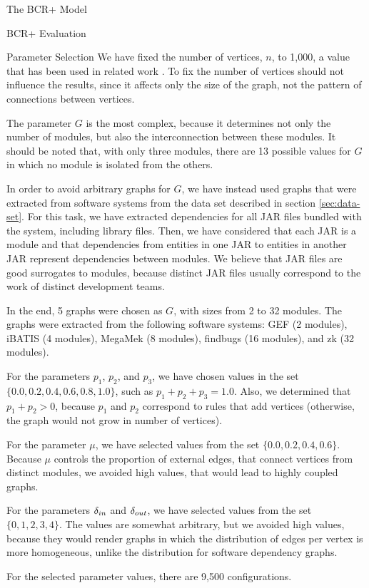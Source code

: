 \documentclass[11pt,twocolumn,a4paper,english]{article}
\begin{document}
\begin{section}{The BCR+ Model}
\begin{subsection}{BCR+ Evaluation}
\begin{subsubsection}{Parameter Selection}
	We have fixed the number of vertices, $n$, to 1,000, a value that has been used in related work \cite{Lancichinetti2009b}. To fix the number of vertices should not influence the results, since it affects only the size of the graph, not the pattern of connections between vertices.
	
	The parameter $G$ is the most complex, because it determines not only the number of modules, but also the interconnection between these modules. It should be noted that, with only three modules, there are 13 possible values for $G$ in which no module is isolated from the others.
	
	In order to avoid arbitrary graphs for $G$, we have instead used graphs that were extracted from software systems from the data set described in section \ref{sec:data-set}. For this task, we have extracted dependencies for all JAR files bundled with the system, including library files. Then, we have considered that each JAR is a module and that dependencies from entities in one JAR to entities in another JAR represent dependencies between modules. We believe that JAR files are good surrogates to modules, because distinct JAR files usually correspond to the work of distinct development teams.
	
	In the end, 5 graphs were chosen as $G$, with sizes from 2 to 32 modules. The graphs were extracted from the following software systems: GEF (2 modules), iBATIS (4 modules), MegaMek (8 modules), findbugs (16 modules), and zk (32 modules).
	
	For the parameters $p_1$, $p_2$, and $p_3$, we have chosen values in the set $\{0.0, 0.2, 0.4, 0.6, 0.8, 1.0\}$, such as $p_1 + p_2 + p_3 = 1.0$. Also, we determined that $p_1 + p_2 > 0$, because $p_1$ and $p_2$ correspond to rules that add vertices (otherwise, the graph would not grow in number of vertices).
	
	For the parameter $\mu$, we have selected values from the set $\{0.0, 0.2, 0.4, 0.6\}$. Because $\mu$ controls the proportion of external edges, that connect vertices from distinct modules, we avoided high values, that would lead to highly coupled graphs.
	
	For the parameters $\delta_{in}$ and $\delta_{out}$, we have selected values from the set $\{0, 1, 2, 3, 4\}$. The values are somewhat arbitrary, but we avoided high values, because they would render graphs in which the distribution of edges per vertex is more homogeneous, unlike the distribution for software dependency graphs.
	
	For the selected parameter values, there are 9,500 configurations.


\end{subsubsection}
\end{subsection}
\end{section}
\end{document}
